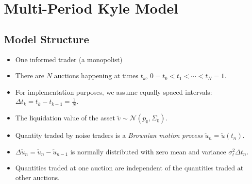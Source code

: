 \documentclass{beamer}
\begin{document}
\section{Multi-Period Kyle Model}
\subsection{Model Structure}

\begin{frame}
    \begin{itemize}
        \item One informed trader (a monopolist)
        \item There are $N$ auctions happening at times $t_k$, $0 = t_0 < t_1 < \cdots < t_N = 1$.
        \item For implementation purposes, we assume equally spaced intervals: $\Delta t_k = t_k - t_{k-1} = \frac{1}{N}$.
        \item The liquidation value of the asset $\tilde{v} \sim \mathcal{N}(p_0, \Sigma_0)$.
    \end{itemize}
\end{frame} 

\begin{frame}
    \begin{itemize}
        \item Quantity traded by noise traders is a \textit{Brownian motion process} $\tilde{u}_n = \tilde{u}(t_n)$.
        \item $\Delta \tilde{u}_n = \tilde{u}_n - \tilde{u}_{n-1}$ is normally distributed with zero mean and variance $\sigma^2_t\Delta t_n$.
        \item Quantities traded at one auction are independent of the quantities traded at other auctions.
    \end{itemize}
\end{frame}
\end{document}
